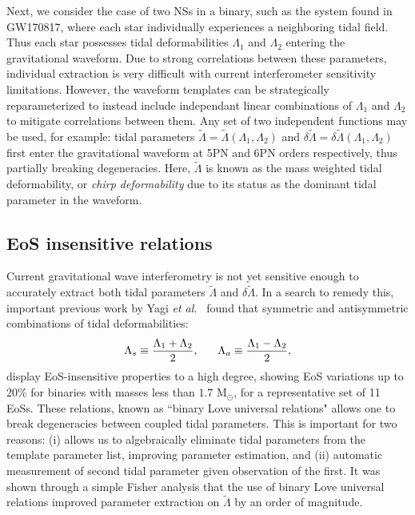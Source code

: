 \documentclass[prd,twocolumn,nofootinbib,superscriptaddress,amsmath,amssymb]{revtex4-1}
\begin{document}
Next, we consider the case of two NSs in a binary, such as the system found in GW170817, where each star 
individually experiences a neighboring tidal field.
Thus each star possesses tidal deformabilities $\Lambda_1$ and $\Lambda_2$ entering the gravitational waveform.
Due to strong correlations between these parameters, individual extraction is very difficult with current interferometer sensitivity limitations.
However, the waveform templates can be strategically reparameterized to instead include independant linear combinations of $\Lambda_1$ and $\Lambda_2$ to mitigate correlations between them. 
Any set of two independent functions may be used, for example: tidal parameters $\tilde{\Lambda}=\tilde{\Lambda}(\Lambda_1,\Lambda_2)$ and $\delta \tilde{\Lambda}=\delta \tilde{\Lambda}(\Lambda_1,\Lambda_2)$~\cite{Wade:tidalCorrections} first enter the gravitational waveform at 5PN and 6PN orders respectively, thus partially breaking degeneracies.
Here, $\tilde{\Lambda}$ is known as the mass weighted tidal deformability, or \emph{chirp deformability} due to its status as the dominant tidal parameter in the waveform. 

\subsection{EoS insensitive relations}\label{sec:eosInsensitive}
Current gravitational wave interferometry is not yet sensitive enough to accurately extract both tidal parameters $\tilde{\Lambda}$ and $\delta\tilde{\Lambda}$.
In a search to remedy this, important previous work by Yagi \textit{et al.}~\cite{Yagi:binLove} found that symmetric and antisymmetric combinations of tidal deformabilities:
\begin{equation}
\Lambda_s \equiv \frac{\Lambda_1 + \Lambda_2}{2}, \hspace{6mm} \Lambda_a \equiv \frac{\Lambda_1 - \Lambda_2}{2},
\end{equation}
display EoS-insensitive properties to a high degree, showing EoS variations up to 20\% for binaries with masses less than $1.7 \text{ M}_{\odot}$, for a representative set of 11 EoSs. 
These relations, known as ``binary Love universal relations" allows one to break degeneracies between coupled tidal parameters.
This is important for two reasons: (i) allows us to algebraically eliminate tidal parameters from the template parameter list, improving parameter estimation, and (ii) automatic measurement of second tidal parameter given observation of the first.
It was shown through a simple Fisher analysis that the use of binary Love universal relations improved parameter extraction on $\tilde{\Lambda}$ by an order of magnitude.
\end{document}
